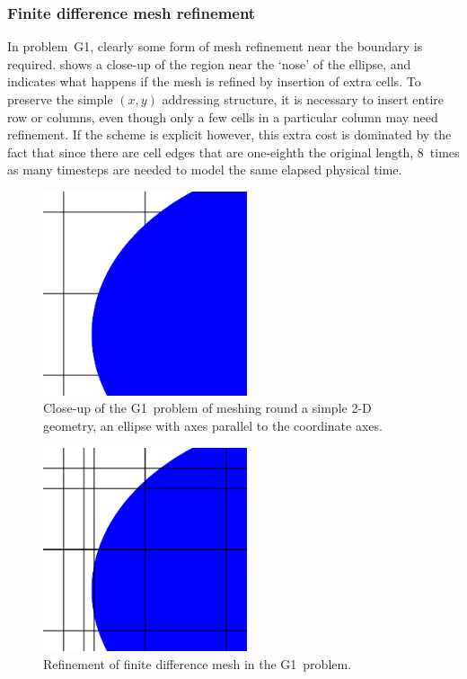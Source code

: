 \subsubsection{Finite difference mesh refinement}\label{sec:fdmeshref}
In problem~G1, clearly some form of mesh refinement near the boundary is required.  shows
a close-up of the region near the `nose' of the ellipse, and  indicates what happens
if the mesh is refined by insertion of extra cells. To preserve the simple $(x,y)$ addressing
structure, it is necessary to insert entire row or columns, even though only a few cells
in a particular column may need refinement. If the scheme is explicit however, this extra
cost is dominated by the fact that since there are cell edges that are one-eighth the
original length, $8$~times as many timesteps are needed to model the same elapsed physical time.
\begin{figure}
\centerline{\includegraphics[width=6cm]{../pics/dmesh}}
\caption{Close-up of the G1~problem of meshing round a simple 2-D geometry, an ellipse
with axes parallel to the coordinate axes.
\label{fig:dmesh}}
\end{figure}
\begin{figure}
\centerline{\includegraphics[width=6cm]{../pics/fd}}
\caption{Refinement of finite difference mesh in the G1~problem.
\label{fig:fd}}
\end{figure}

